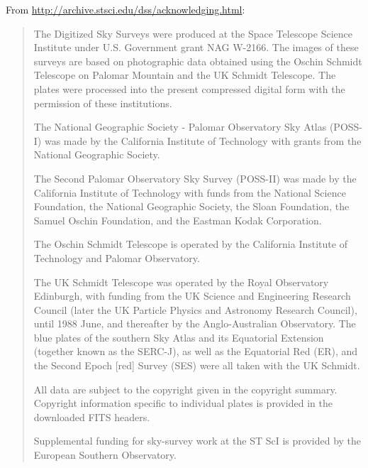 From \url{http://archive.stsci.edu/dss/acknowledging.html}: %
\begin{quotation}
\noindent The Digitized Sky Surveys were produced at the Space Telescope Science Institute under U.S. Government grant NAG W-2166. 
The images of these surveys are based on photographic data obtained using the Oschin Schmidt Telescope on Palomar Mountain and the UK Schmidt Telescope. 
The plates were processed into the present compressed digital form with the permission of these institutions.

The National Geographic Society - Palomar Observatory Sky Atlas (POSS-I) was made by the 
California Institute of Technology with grants from the National Geographic Society.

The Second Palomar Observatory Sky Survey (POSS-II) was made by the California Institute of Technology with 
funds from the National Science Foundation, the National Geographic Society, the Sloan Foundation, 
the Samuel Oschin Foundation, and the Eastman Kodak Corporation.

The Oschin Schmidt Telescope is operated by the California Institute of Technology and Palomar Observatory.

The UK Schmidt Telescope was operated by the Royal Observatory Edinburgh, with funding from the 
UK Science and Engineering Research Council (later the UK Particle Physics and Astronomy Research Council), 
until 1988 June, and thereafter by the Anglo-Australian Observatory. 
The blue plates of the southern Sky Atlas and its Equatorial Extension (together known as the SERC-J), 
as well as the Equatorial Red (ER), and the Second Epoch [red] Survey (SES) were all taken with the UK Schmidt.

All data are subject to the copyright given in the copyright summary. 
Copyright information specific to individual plates is provided in the downloaded FITS headers.

Supplemental funding for sky-survey work at the ST ScI is provided by the European Southern Observatory. 
\end{quotation}


